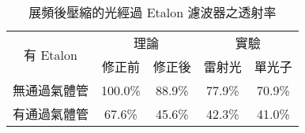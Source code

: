 \documentclass[class=NCU_thesis, crop=false]{standalone}
\begin{document}
\begin{table}[h]
    \centering
    \caption{展頻後壓縮的光經過 Etalon 濾波器之透射率}
    \begin{tabular}{| c | c | c | c | c |}
\hline
    \multirow{2}{*}{有 Etalon}& \multicolumn{2}{c|}{ 理論 } & \multicolumn{2}{c|}{ 實驗 }
    \\ \cline{2-5}
        & 修正前 & 修正後 & 雷射光 & 單光子
    \\ \hline
    無通過氣體管 & 100.0\% & 88.9\% & 77.9\% & 70.9\%\\ \hline
    有通過氣體管 & 67.6\% & 45.6\% & 42.3\% & 41.0\%\\ \hline
    \end{tabular}
    \label{tab:compress_abs}
\end{table}
\end{document}
